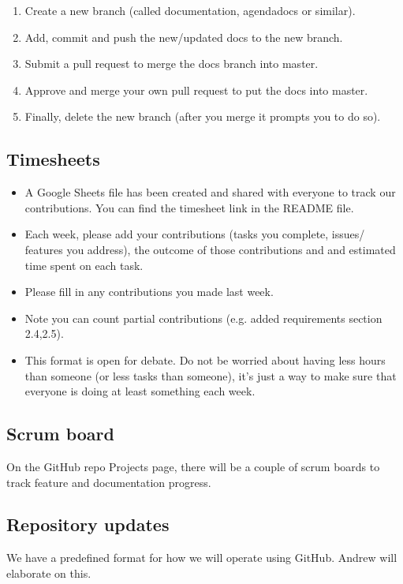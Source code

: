 \documentclass[11pt, a4paper]{article}
\begin{document}
\begin{flushleft}
\begin{itemize}
\begin{enumerate}
  \item Create a new branch (called documentation, agendadocs or similar).
  \item Add, commit and push the new/updated docs to the new branch.
  \item Submit a pull request to merge the docs branch into master.
  \item Approve and merge your own pull request to put the docs into master.
  \item Finally, delete the new branch (after you merge it prompts you to do so).
  
  \end{enumerate}
  
  \end{itemize}
  \subsection{Timesheets}
  \begin{itemize}
  \item A Google Sheets file has been created and shared with everyone to track our contributions. You can find the timesheet link in the README file.
  \item Each week, please add your contributions (tasks you complete, issues/ features you address), the outcome of those contributions and and estimated time spent on each task.
  \item Please fill in any contributions you made last week.
  \item Note you can count partial contributions (e.g. added requirements section 2.4,2.5).
  \item This format is open for debate. Do not be worried about having less hours than someone (or less tasks than someone), it's just a way to make sure that everyone is doing at least something each week.
  \end{itemize}
  
  \subsection{Scrum board}
  On the GitHub repo Projects page, there will be a couple of scrum boards to track feature and documentation progress.
  
  \subsection{Repository updates}
  We have a predefined format for how we will operate using GitHub. Andrew will elaborate on this.


\end{flushleft}
\end{document}
